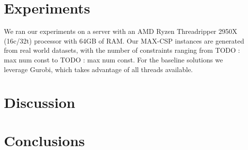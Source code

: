 \documentclass[a4paper]{article}
\newcommand{\red}[1]{{\color{red}#1}}
\begin{document}
\section{Experiments}

We ran our experiments on a server with an AMD Ryzen Threadripper 2950X (16c/32t) processor with 
64GB of RAM. Our MAX-CSP instances are generated from real world datasets, with the number of constraints 
ranging from \red{TODO : max num const} to \red{TODO : max num const}. For the baseline solutions we 
leverage Gurobi, which takes advantage of all threads available. 


\section{Discussion}
\section{Conclusions}


%
%
\end{document}
